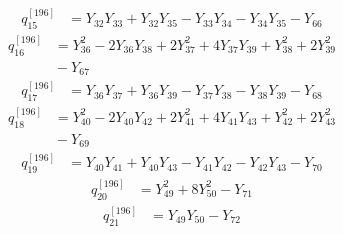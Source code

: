\begin{equation}\label{q196:row:015}
\begin{aligned}
q_{15}^{[196]} &={} Y_{32}Y_{33} + Y_{32}Y_{35} - Y_{33}Y_{34} - Y_{34}Y_{35} - Y_{66}
\end{aligned}
\end{equation}
\begin{equation}\label{q196:row:016}
\begin{aligned}
q_{16}^{[196]} &={} Y_{36}^{2} - 2Y_{36}Y_{38} + 2Y_{37}^{2} + 4Y_{37}Y_{39} + Y_{38}^{2} + 2Y_{39}^{2}\\
&{} - Y_{67}
\end{aligned}
\end{equation}
\begin{equation}\label{q196:row:017}
\begin{aligned}
q_{17}^{[196]} &={} Y_{36}Y_{37} + Y_{36}Y_{39} - Y_{37}Y_{38} - Y_{38}Y_{39} - Y_{68}
\end{aligned}
\end{equation}
\begin{equation}\label{q196:row:018}
\begin{aligned}
q_{18}^{[196]} &={} Y_{40}^{2} - 2Y_{40}Y_{42} + 2Y_{41}^{2} + 4Y_{41}Y_{43} + Y_{42}^{2} + 2Y_{43}^{2}\\
&{} - Y_{69}
\end{aligned}
\end{equation}
\begin{equation}\label{q196:row:019}
\begin{aligned}
q_{19}^{[196]} &={} Y_{40}Y_{41} + Y_{40}Y_{43} - Y_{41}Y_{42} - Y_{42}Y_{43} - Y_{70}
\end{aligned}
\end{equation}
\begin{equation}\label{q196:row:020}
\begin{aligned}
q_{20}^{[196]} &={} Y_{49}^{2} + 8Y_{50}^{2} - Y_{71}
\end{aligned}
\end{equation}
\begin{equation}\label{q196:row:021}
\begin{aligned}
q_{21}^{[196]} &={} Y_{49}Y_{50} - Y_{72}
\end{aligned}
\end{equation}
